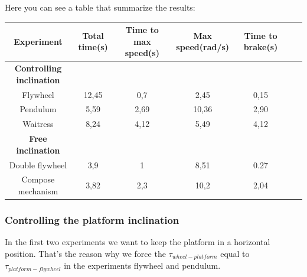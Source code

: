 Here you can see a table that summarize the results:
\begin{center}
	\begin{tabular}{ |c|c|c|c|c|c|c| } 
	 \hline
	 \textbf{Experiment} & \textbf{Total time(s)} & \textbf{Time to max speed(s)} 
	 & \textbf{Max speed(rad/s)} & \textbf{Time to brake(s)}\\
	 \hline
	 \textbf{Controlling inclination} \\
	 \hline
	 Flywheel & 12,45 & 0,7 & 2,45 & 0,15\\
	 \hline
	 Pendulum & 5,59 & 2,69 & 10,36 & 2,90\\
	 \hline
	 Waitress & 8,24 & 4,12 & 5,49 & 4,12\\
	 \hline
	 \textbf{Free inclination} \\
	 \hline
	 Double flywheel & 3,9 & 1 & 8,51 & 0.27\\
	 \hline
	 Compose mechanism & 3,82 & 2,3 & 10,2 & 2,04\\
	 \hline
	\end{tabular}
\end{center}

\subsubsection{Controlling the platform inclination}
In the first two experiments we want to keep the platform in a horizontal position.
That's the reason why we force the $ \tau_{wheel-platform}$ equal to
$\tau_{platform-flywheel}$ in the experiments flywheel and pendulum.

